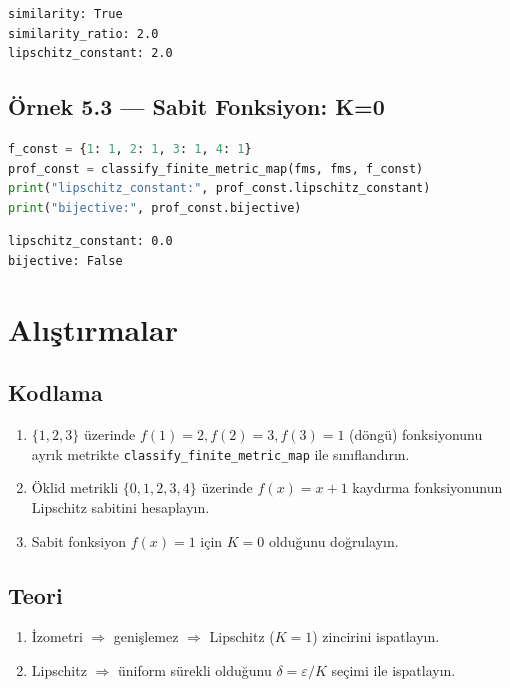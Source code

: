 \begin{verbatim}
similarity: True
similarity_ratio: 2.0
lipschitz_constant: 2.0
\end{verbatim}

\subsection*{Örnek 5.3 — Sabit Fonksiyon: K=0}

\begin{lstlisting}[language=Python]
f_const = {1: 1, 2: 1, 3: 1, 4: 1}
prof_const = classify_finite_metric_map(fms, fms, f_const)
print("lipschitz_constant:", prof_const.lipschitz_constant)
print("bijective:", prof_const.bijective)
\end{lstlisting}

\begin{verbatim}
lipschitz_constant: 0.0
bijective: False
\end{verbatim}

\section{Alıştırmalar}

\subsection*{Kodlama}

\begin{enumerate}[label=K\arabic*.]
\item $\{1,2,3\}$ üzerinde $f(1)=2, f(2)=3, f(3)=1$ (döngü) fonksiyonunu ayrık
      metrikte \texttt{classify\_finite\_metric\_map} ile sınıflandırın.
\item Öklid metrikli $\{0,1,2,3,4\}$ üzerinde $f(x) = x+1$ kaydırma fonksiyonunun
      Lipschitz sabitini hesaplayın.
\item Sabit fonksiyon $f(x) = 1$ için $K=0$ olduğunu doğrulayın.
\end{enumerate}

\subsection*{Teori}

\begin{enumerate}[label=T\arabic*.]
\item İzometri $\Rightarrow$ genişlemez $\Rightarrow$ Lipschitz ($K=1$) zincirini ispatlayın.
\item Lipschitz $\Rightarrow$ üniform sürekli olduğunu $\delta = \varepsilon/K$ seçimi
      ile ispatlayın.
\end{enumerate}
